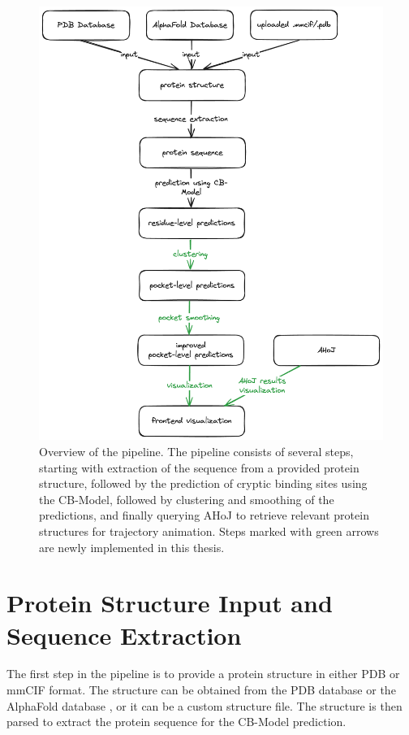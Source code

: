 \begin{figure}[htbp]
    \centering
    \includegraphics[width=\textwidth]{img/methodology-overview.png}
    \caption{Overview of the pipeline. The pipeline consists of several steps, starting with extraction of the sequence from a provided protein structure, followed by the prediction of cryptic binding sites using the CB-Model, followed by clustering and smoothing of the predictions, and finally querying AHoJ to retrieve relevant protein structures for trajectory animation. Steps marked with green arrows are newly implemented in this thesis.}
    \label{fig:pipeline-overview}
\end{figure}

\section{Protein Structure Input and Sequence Extraction}
\label{sec:structure-input}

The first step in the pipeline is to provide a protein structure in either PDB or mmCIF format. The structure can be obtained from the PDB database \cite{berman2000protein} or the AlphaFold database \cite{jumper2021highly}, or it can be a custom structure file. The structure is then parsed to extract the protein sequence for the CB-Model prediction.

